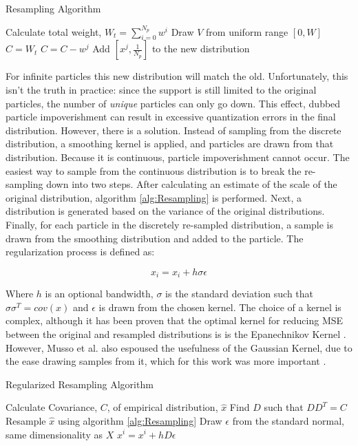 \begin{algorithm}
\caption{Resampling Algorithm}
\begin{algorithmic}
\STATE Calculate total weight, $W_t = \sum_{i=0}^{N_p} w^i$
    \STATE Draw $V$ from uniform range $[0, W]$
    \STATE $C = W_t$
        \STATE $C = C - w^j$
    \ENDFOR
    \STATE Add $[x^j, \frac{1}{N_p}]$ to the new distribution
\ENDFOR
\STATE 
\end{algorithmic}
\label{alg:Resampling}
\end{algorithm}
For infinite particles this new distribution will match the old.
Unfortunately, this isn't the truth in practice: since the support is
still limited to the original particles, the number of \emph{unique} particles can only go down.
This effect, dubbed particle impoverishment can result in excessive quantization
errors in the final distribution. However, there is a solution. Instead of sampling from the
discrete distribution, a smoothing kernel is applied, and particles are drawn from
that distribution. Because it is continuous, particle impoverishment
cannot occur. The easiest way to sample from the continuous distribution is to break the 
re-sampling down into two steps. After calculating an estimate of the scale of the original
distribution, algorithm \autoref{alg:Resampling} is performed. Next, a distribution is generated
based on the variance of the original distributions.
Finally, for each particle in the discretely re-sampled distribution, a sample is drawn from 
the smoothing 
distribution and added to the particle.  The regularization process is defined as:

\begin{equation}
x_i = x_i + h\sigma \epsilon
\end{equation}

Where $h$ is an optional bandwidth, $\sigma$ is the standard deviation such that 
$\sigma \sigma^T = cov(x)$
and $\epsilon$ is drawn from the chosen kernel. The choice of a kernel is
complex, although it has been proven that the optimal kernel for reducing MSE between
the original and resampled distributions is 
is the Epanechnikov Kernel \cite{Musso2001a}. However, Musso et al. 
also espoused the usefulness of the Gaussian Kernel, due to the ease
drawing samples from it, which for this work was more important \cite{Musso2001a}.

\begin{algorithm}
\caption{Regularized Resampling Algorithm}
\begin{algorithmic}
\STATE Calculate Covariance, $C$, of empirical distribution, $\hat{x}$
\STATE Find $D$ such that $DD^T = C$
\STATE Resample $\hat{x}$ using algorithm \autoref{alg:Resampling}
    \STATE Draw $\epsilon$ from the standard normal, same dimensionality as $X$
    \STATE $x^i = x^i + hD\epsilon$
\ENDFOR
\end{algorithmic}
\label{alg:RegResampling}
\end{algorithm}

